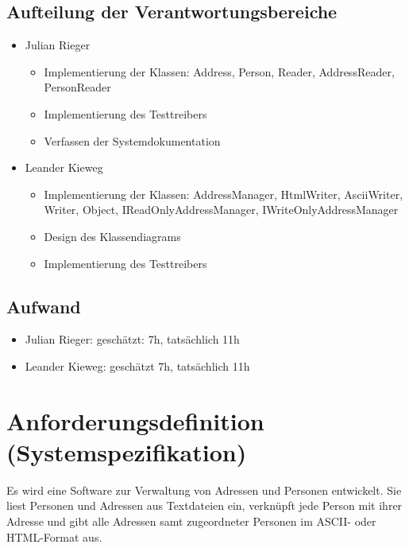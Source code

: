 \documentclass[a4paper,12pt]{article}
\begin{document}
\subsection{Aufteilung der Verantwortungsbereiche}
\begin{itemize}
\item Julian Rieger
    \begin{itemize}
        \item Implementierung der Klassen: Address, Person, Reader, AddressReader, PersonReader
        \item Implementierung des Testtreibers
        \item Verfassen der Systemdokumentation
    \end{itemize}
\item Leander Kieweg
    \begin{itemize}
        \item Implementierung der Klassen: AddressManager, HtmlWriter, AsciiWriter, Writer,
        Object, IReadOnlyAddressManager, IWriteOnlyAddressManager
        \item Design des Klassendiagrams
        \item Implementierung des Testtreibers

    \end{itemize}
\end{itemize}

\subsection{Aufwand}
\begin{itemize}
\item Julian Rieger: geschätzt: 7h, tatsächlich 11h
\item Leander Kieweg: geschätzt 7h, tatsächlich 11h
\end{itemize}
\section{Anforderungsdefinition (Systemspezifikation)}
Es wird eine Software zur Verwaltung von Adressen und Personen entwickelt. Sie liest
Personen und Adressen aus Textdateien ein, verknüpft jede Person mit ihrer Adresse und
gibt alle Adressen samt zugeordneter Personen im ASCII- oder HTML-Format aus.
\end{document}

